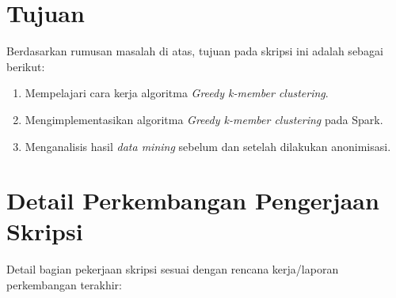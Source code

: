 \documentclass[a4paper,twoside]{article}
\begin{document}
\newpage
\section{Tujuan}
Berdasarkan rumusan masalah di atas, tujuan pada skripsi ini adalah sebagai berikut:
\begin{enumerate}
\item Mempelajari cara kerja algoritma {\it Greedy k-member clustering}.
\item Mengimplementasikan algoritma {\it Greedy k-member clustering } pada Spark.
\item Menganalisis hasil {\it data mining} sebelum dan setelah dilakukan anonimisasi.
\end{enumerate}

\section{Detail Perkembangan Pengerjaan Skripsi}
Detail bagian pekerjaan skripsi sesuai dengan rencana kerja/laporan perkembangan terakhir:
\end{document}
